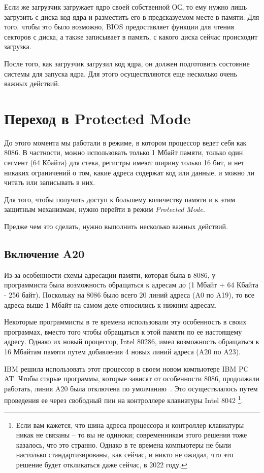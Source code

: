 \documentclass[a4page]{article}
\begin{document}
Если же загрузчик загружает ядро своей собственной ОС, то ему нужно лишь загрузить с диска код ядра
и разместить его в предсказуемом месте в памяти.
Для того, чтобы это было возможно, BIOS предоставляет функции для чтения секторов с диска,
а также записывает в память, с какого диска сейчас происходит загрузка.

После того, как загрузчик загрузил код ядра, он должен подготовить состояние системы для запуска ядра.
Для этого осуществляются еще несколько очень важных действий.

\section{Переход в Protected Mode}

До этого момента мы работали в режиме, в котором процессор ведет себя как 8086.
В частности, можно использовать только 1 Мбайт памяти, только один сегмент (64 Кбайта) для стека,
регистры имеют ширину только 16 бит,
и нет никаких ограничений о том, какие адреса содержат код или данные, и можно ли читать или записывать в них.

Для того, чтобы получить доступ к большему количеству памяти и к этим защитным механизмам,
нужно перейти в режим \emph{Protected Mode}.

Предже чем это сделать, нужно выполнить несколько важных действий.

\subsection{Включение A20}

Из-за особенности схемы адресации памяти, которая была в 8086, у программиста была возможность обращаться
к адресам до (1 Мбайт + 64 Кбайта - 256 байт).
Поскольку на 8086 было всего 20 линий адреса (A0 по A19),
то все адреса выше 1 Мбайт на самом деле относились к нижним адресам.

Некоторые программисты в те времена использовали эту особенность в своих программах,
вместо того чтобы обращаться к этой памяти по ее настоящему адресу.
Однако их новый процессор, Intel 80286, имел возможность обращаться к 16 Мбайтам памяти путем добавления
4 новых линий адреса (A20 по A23).

IBM решила использовать этот процессор в своем новом компьютере IBM PC AT.
Чтобы старые программы, которые зависят от особенности 8086, продолжали работать,
линия A20 была отключена по умолчанию~\cite{osdev:a20}.
Это осуществлалось путем проведения ее через свободный пин на контроллере клавиатуры Intel 8042
\footnote{Если вам кажется, что шина адреса процессора и контроллер клавиатуры никак не связаны --
то вы не одиноки; современникам этого решения тоже казалось, что это странно.
Однако в те времена компьютеры не были настолько стандартизированы, как сейчас,
и никто не ожидал, что это решение будет откликаться даже сейчас, в 2022 году.}.
\end{document}

